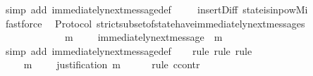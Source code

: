 \begin{isabellebody}
\ {\isacharparenleft}simp\ add{\isacharcolon}\ immediately{\isacharunderscore}next{\isacharunderscore}message{\isacharunderscore}def{\isacharparenright}\ \isanewline
\ \ \isamarkupfalse%
\ insert{\isacharunderscore}Diff\ state{\isacharunderscore}is{\isacharunderscore}in{\isacharunderscore}pow{\isacharunderscore}M{\isacharunderscore}i\ \isamarkupfalse%
\ fastforce%
\endisatagproof
{\isafoldproof}%
%
\isadelimproof
\isanewline
%
\endisadelimproof
\isanewline
{}\isamarkupfalse%
\ {\isacharparenleft}\ Protocol{\isacharparenright}\ strict{\isacharunderscore}subset{\isacharunderscore}of{\isacharunderscore}state{\isacharunderscore}have{\isacharunderscore}immediately{\isacharunderscore}next{\isacharunderscore}messages{\isacharcolon}\ \isanewline
\ \ {\isachardoublequoteopen}{\isasymforall}\ {\isasymsigma}\ {\isasymin}\ {\isasymSigma}{\isachardot}\ {\isasymforall}\ {\isasymsigma}{\isacharprime}{\isachardot}\ {\isasymsigma}{\isacharprime}\ {\isasymsubset}\ {\isasymsigma}\ {\isasymlongrightarrow}\ {\isacharparenleft}{\isasymexists}\ m\ {\isasymin}\ {\isasymsigma}\ {\isacharminus}\ {\isasymsigma}{\isacharprime}{\isachardot}\ immediately{\isacharunderscore}next{\isacharunderscore}message\ {\isacharparenleft}{\isasymsigma}{\isacharprime}{\isacharcomma}\ m{\isacharparenright}{\isacharparenright}{\isachardoublequoteclose}\isanewline
%
\isadelimproof
\ \ %
\endisadelimproof
%
\isatagproof
{}\isamarkupfalse%
\ {\isacharparenleft}simp\ add{\isacharcolon}\ immediately{\isacharunderscore}next{\isacharunderscore}message{\isacharunderscore}def{\isacharparenright}\isanewline
\ \ \isamarkupfalse%
\ {\isacharparenleft}rule{\isacharcomma}\ rule{\isacharcomma}\ rule{\isacharparenright}\isanewline
{}\isamarkupfalse%
\ {\isacharminus}\isanewline
\ \ \isamarkupfalse%
\ {\isasymsigma}\ {\isasymsigma}{\isacharprime}\isanewline
\ \ \isamarkupfalse%
\ {\isachardoublequoteopen}{\isasymsigma}\ {\isasymin}\ {\isasymSigma}{\isachardoublequoteclose}\isanewline
\ \ \isamarkupfalse%
\ {\isachardoublequoteopen}{\isasymsigma}{\isacharprime}\ {\isasymsubset}\ {\isasymsigma}{\isachardoublequoteclose}\isanewline
\ \ \isamarkupfalse%
\ {\isachardoublequoteopen}{\isasymexists}\ m\ {\isasymin}\ {\isasymsigma}\ {\isacharminus}\ {\isasymsigma}{\isacharprime}{\isachardot}\ justification\ m\ {\isasymsubseteq}\ {\isasymsigma}{\isacharprime}{\isachardoublequoteclose}\isanewline
\ \ \isamarkupfalse%
\ {\isacharparenleft}rule\ ccontr{\isacharparenright}\isanewline

\end{isabellebody}
